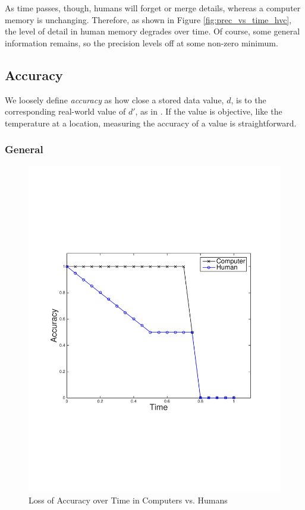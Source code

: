 As time passes, though, humans will forget or merge details, whereas a computer memory is unchanging.  Therefore, as shown in Figure \ref{fig:prec_vs_time_hvc}, the level of detail in human memory degrades over time.  Of course, some general information remains, so the precision levels off at some non-zero minimum.

\subsection{Accuracy}

We loosely define \emph{accuracy} as how close a stored data value, $d$, is to the corresponding real-world value of $d'$, as in \cite{batini2009methodologies}.  If the value is objective, like the temperature at a location, measuring the accuracy of a value is straightforward. 

\subsubsection{General}
\begin{figure}
\begin{centering}
    \includegraphics[clip=true, trim = 15mm 65mm 25mm 70mm, scale=0.40]{figures/example_qoi_trends/accuracy_hvc_2.pdf}
    \caption{Loss of Accuracy over Time in Computers vs. Humans }
    \label{fig:acc_vs_time_hvc_gen}
\end{centering}
\end{figure}

